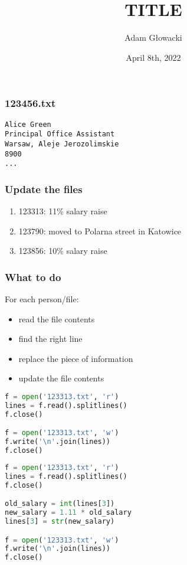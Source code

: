 \documentclass[aspectratio=169]{beamer}
\title{TITLE}
\author{Adam Głowacki}
\date{April 8th, 2022}
\begin{document}
\begin{frame}
\titlepage
\end{frame}

\begin{frame}[fragile]
\frametitle{123456.txt}
\begin{verbatim}
Alice Green
Principal Office Assistant
Warsaw, Aleje Jerozolimskie
8900
...
\end{verbatim}
\end{frame}

\begin{frame}
\frametitle{Update the files}
\begin{enumerate}
  \item 123313: 11\% salary raise
  \item 123790: moved to Polarna street in Katowice
  \item 123856: 10\% salary raise
\end{enumerate}
\end{frame}

\begin{frame}
\frametitle{What to do}
For each person/file:
\begin{itemize}
  \item read the file contents
  \item find the right line
  \item replace the piece of information
  \item update the file contents
\end{itemize}
\end{frame}

\begin{frame}[fragile]
\begin{lstlisting}[language=python]
f = open('123313.txt', 'r')
lines = f.read().splitlines()
f.close()

f = open('123313.txt', 'w')
f.write('\n'.join(lines))
f.close()
\end{lstlisting}
\end{frame}

\begin{frame}[fragile]
\begin{lstlisting}[language=python]
f = open('123313.txt', 'r')
lines = f.read().splitlines()
f.close()

old_salary = int(lines[3])
new_salary = 1.11 * old_salary
lines[3] = str(new_salary)

f = open('123313.txt', 'w')
f.write('\n'.join(lines))
f.close()
\end{lstlisting}
\end{frame}
\end{document}
